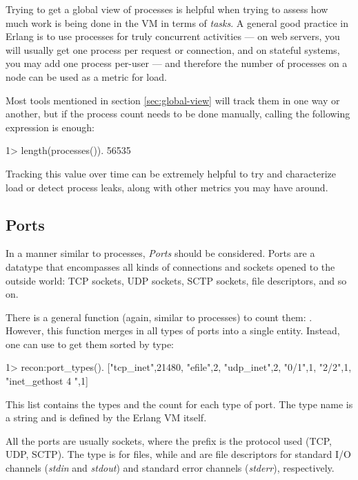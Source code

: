\documentclass[11pt, oneside]{book}   	%
\begin{document}
Trying to get a global view of processes is helpful when trying to assess how much work is being done in the VM in terms of \emph{tasks}. A general good practice in Erlang is to use processes for truly concurrent activities — on web servers, you will usually get one process per request or connection, and on stateful systems, you may add one process per-user — and therefore the number of processes on a node can be used as a metric for load.

Most tools mentioned in section \ref{sec:global-view} will track them in one way or another, but if the process count needs to be done manually, calling the following expression is enough:

\begin{VerbatimEshell}
1> length(processes()).
56535
\end{VerbatimEshell}

Tracking this value over time can be extremely helpful to try and characterize load or detect process leaks, along with other metrics you may have around.

\subsection{Ports}
\label{subsec:global-ports}

In a manner similar to processes, \emph{Ports} should be considered. Ports are a datatype that encompasses all kinds of connections and sockets opened to the outside world: TCP sockets, UDP sockets, SCTP sockets, file descriptors, and so on.

There is a general function (again, similar to processes) to count them: . However, this function merges in all types of ports into a single entity. Instead, one can use  to get them sorted by type:

\begin{VerbatimEshell}
1> recon:port_types().
[{"tcp_inet",21480},
 {"efile",2},
 {"udp_inet",2},
 {"0/1",1},
 {"2/2",1},
 {"inet_gethost 4 ",1}]
 \end{VerbatimEshell}

This list contains the types and the count for each type of port. The type name is a string and is defined by the Erlang VM itself.

All the  ports are usually sockets, where the prefix is the protocol used (TCP, UDP, SCTP). The  type is for files, while  and  are file descriptors for standard I/O channels (\emph{stdin} and \emph{stdout}) and standard error channels (\emph{stderr}), respectively.
\end{document}
